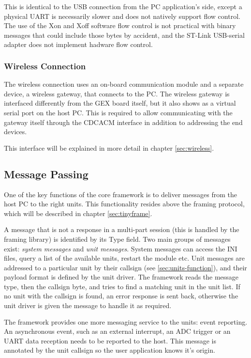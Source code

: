This is identical to the \gls{USB} connection from the \gls{PC} application's side, except a physical \gls{UART} is necessarily slower and does not natively support flow control. The use of the Xon and Xoff software flow control is not practical with binary messages that could include those bytes by accident, and the ST-Link \gls{USB}-serial adapter does not implement hadware flow control.

\subsubsection{Wireless Connection}

The wireless connection uses an on-board communication module and a separate device, a wireless gateway, that connects to the \gls{PC}. The wireless gateway is interfaced differently from the GEX board itself, but it also shows as a virtual serial port on the host \gls{PC}. This is required to allow communicating with the gateway itself through the \gls{CDCACM} interface in addition to addressing the end devices.

This interface will be explained in more detail in chapter \ref{sec:wireless}.

\subsection{Message Passing} \label{sec:message_passing}

One of the key functions of the core framework is to deliver messages from the host \gls{PC} to the right units. This functionality resides above the framing protocol, which will be described in chapter \ref{sec:tinyframe}.

A message that is not a response in a multi-part session (this is handled by the framing library) is identified by its Type field. Two main groups of messages exist: \textit{system messages} and \textit{unit messages}. System messages can access the INI files, query a list of the available units, restart the module etc. Unit messages are addressed to a particular unit by their callsign (see \ref{sec:units-function}), and their payload format is defined by the unit driver. The framework reads the message type, then the callsign byte, and tries to find a matching unit in the unit list. If no unit with the callsign is found, an error response is sent back, otherwise the unit driver is given the message to handle it as required.

The framework provides one more messaging service to the units: event reporting. An asynchronous event, such as an external interrupt, an \gls{ADC} trigger or an \gls{UART} data reception needs to be reported to the host. This message is annotated by the unit callsign so the user application knows it's origin.


